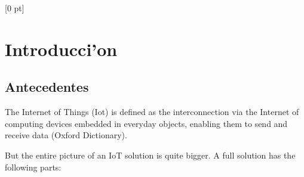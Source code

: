 
\titlespacing{\chapter}{0 pt}{30 pt}{50 pt}[0 pt]
\titleformat{\section}{\Large\bfseries}{\thesection}{0 pt}{\hspace{30 pt}}
\titleformat{\subsection}{\large\bfseries}{\thesubsection}{0 pt}{\hspace{30 pt}}
\pagestyle{fancy}
\fancyhead[LO,LE]{\footnotesize\textit{\leftmark}}
\fancyhead[RO,RE]{\thepage}
\fancyfoot[CO,CE]{}

\chapter{Introducci'on} %

\normalsize

\section{Antecedentes}
\vspace{30 pt}
\noindent
The Internet of Things (Iot) is defined as the interconnection via the Internet 
of computing devices embedded in everyday objects, enabling them to send and 
receive data (Oxford Dictionary). 

But the entire picture of an IoT solution is quite bigger. A full solution has 
the following parts:

